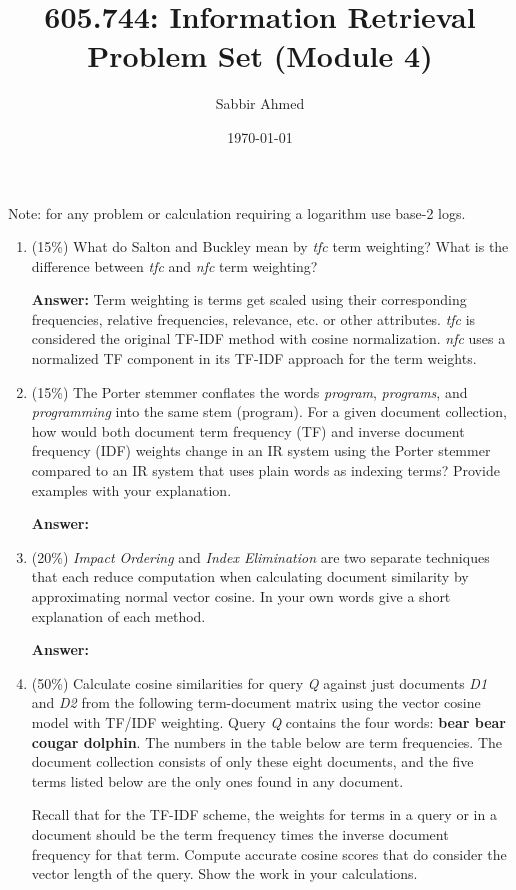 \documentclass[11pt]{article}
\title{605.744: Information Retrieval \\ Problem Set (Module 4)}
\author{Sabbir Ahmed}
\date{\today}
\begin{document}
\maketitle

    Note: for any problem or calculation requiring a logarithm use base-2 logs.
    \begin{enumerate}

        \item (15\%) What do Salton and Buckley mean by \textit{tfc} term weighting? What is the difference between \textit{tfc} and \textit{nfc} term weighting?
        
        \textbf{Answer:} Term weighting is terms get scaled using their corresponding frequencies, relative frequencies, relevance, etc. or other attributes. \textit{tfc} is considered the original TF-IDF method with cosine normalization. \textit{nfc} uses a normalized TF component in its TF-IDF approach for the term weights.

        \item (15\%) The Porter stemmer conflates the words \textit{program}, \textit{programs}, and \textit{programming} into the same stem (program). For a given document collection, how would both document term frequency (TF) and inverse document frequency (IDF) weights change in an IR system using the Porter stemmer compared to an IR system that uses plain words as indexing terms? Provide examples with your explanation.

        \textbf{Answer:} 

        \item (20\%) \textit{Impact Ordering} and \textit{Index Elimination} are two separate techniques that each reduce computation when calculating document similarity by approximating normal vector cosine. In your own words give a short explanation of each method.

        \textbf{Answer:}

        \item (50\%) Calculate cosine similarities for query \textit{Q} against just documents \textit{D1} and \textit{D2} from the following term-document matrix using the vector cosine model with TF/IDF weighting. Query \textit{Q} contains the four words: \textbf{bear bear cougar dolphin}. The numbers in the table below are term frequencies. The document collection consists of only these eight documents, and the five terms listed below are the only ones found in any document.

        Recall that for the TF-IDF scheme, the weights for terms in a query or in a document should be the term frequency times the inverse document frequency for that term. Compute accurate cosine scores that do consider the vector length of the query. Show the work in your calculations.


\end{enumerate}
\end{document}
